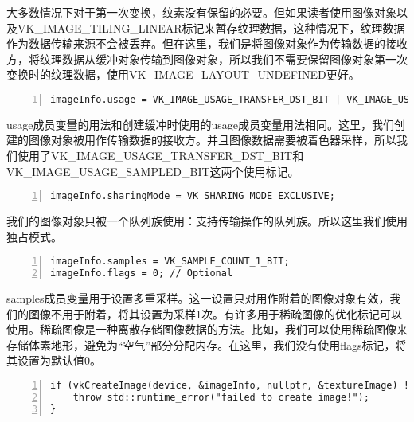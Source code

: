 \documentclass{ctexart}
\begin{document}
大多数情况下对于第一次变换，纹素没有保留的必要。但如果读者使用图像对象以及VK\_IMAGE\_TILING\_LINEAR标记来暂存纹理数据，这种情况下，纹理数据作为数据传输来源不会被丢弃。但在这里，我们是将图像对象作为传输数据的接收方，将纹理数据从缓冲对象传输到图像对象，所以我们不需要保留图像对象第一次变换时的纹理数据，使用VK\_IMAGE\_LAYOUT\_UNDEFINED更好。

\begin{lstlisting}[language={[ANSI]C},keywordstyle=\color{blue!70},commentstyle=\color{red!50!green!50!blue!50},frame=shadowbox, rulesepcolor=\color{red!20!green!20!blue!20},basicstyle=\small,numbers=left, numberstyle=\tiny,breaklines=true]
imageInfo.usage = VK_IMAGE_USAGE_TRANSFER_DST_BIT | VK_IMAGE_USAGE_SAMPLED_BIT;
\end{lstlisting}

usage成员变量的用法和创建缓冲时使用的usage成员变量用法相同。这里，我们创建的图像对象被用作传输数据的接收方。并且图像数据需要被着色器采样，所以我们使用了VK\_IMAGE\_USAGE\_TRANSFER\_DST\_BIT和VK\_IMAGE\_USAGE\_SAMPLED\_BIT这两个使用标记。

\begin{lstlisting}[language={[ANSI]C},keywordstyle=\color{blue!70},commentstyle=\color{red!50!green!50!blue!50},frame=shadowbox, rulesepcolor=\color{red!20!green!20!blue!20},basicstyle=\small,numbers=left, numberstyle=\tiny,breaklines=true]
imageInfo.sharingMode = VK_SHARING_MODE_EXCLUSIVE;
\end{lstlisting}

我们的图像对象只被一个队列族使用：支持传输操作的队列族。所以这里我们使用独占模式。

\begin{lstlisting}[language={[ANSI]C},keywordstyle=\color{blue!70},commentstyle=\color{red!50!green!50!blue!50},frame=shadowbox, rulesepcolor=\color{red!20!green!20!blue!20},basicstyle=\small,numbers=left, numberstyle=\tiny,breaklines=true]
imageInfo.samples = VK_SAMPLE_COUNT_1_BIT;
imageInfo.flags = 0; // Optional
\end{lstlisting}

samples成员变量用于设置多重采样。这一设置只对用作附着的图像对象有效，我们的图像不用于附着，将其设置为采样1次。有许多用于稀疏图像的优化标记可以使用。稀疏图像是一种离散存储图像数据的方法。比如，我们可以使用稀疏图像来存储体素地形，避免为“空气”部分分配内存。在这里，我们没有使用flags标记，将其设置为默认值0。

\begin{lstlisting}[language={[ANSI]C},keywordstyle=\color{blue!70},commentstyle=\color{red!50!green!50!blue!50},frame=shadowbox, rulesepcolor=\color{red!20!green!20!blue!20},basicstyle=\small,numbers=left, numberstyle=\tiny,breaklines=true]
if (vkCreateImage(device, &imageInfo, nullptr, &textureImage) != VK_SUCCESS) {
	throw std::runtime_error("failed to create image!");
}
\end{lstlisting}
\end{document}

